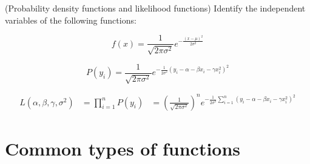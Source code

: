 \begin{examplebox}{(Probability density functions and likelihood functions)}
	Identify the independent variables of the following functions:

	\[
		f(x) = \frac{1 }{\sqrt{2 \pi \sigma^{2}}}e^{-\frac{(x-\mu)^{2}}{2 \sigma^{2}}}
	\]

	\[
P(y_{i }) = \frac{1 }{\sqrt{2 \pi \sigma^{2}}} e^{- \frac{1 }{2 \sigma^{2 }}(y_{i }-\alpha-\beta x_{i } - \gamma x_{i }^{2})^{2}}
	\]

	\begin{align*}
	L(\alpha,\beta,\gamma,\sigma^{2}) &= \prod^{n}_{i=1}P(y_{i })
	&=\left(\frac{1 }{\sqrt{2 \pi  \sigma^{2}}}\right)^{n} e^{- \frac{1 }{2 \sigma^{2 }} \sum^{n }_{i=1}(y_{i }-\alpha-\beta x_{i } - \gamma x_{i }^{2})^{2}}
	\end{align*}

\end{examplebox}


\section{Common types of functions}

